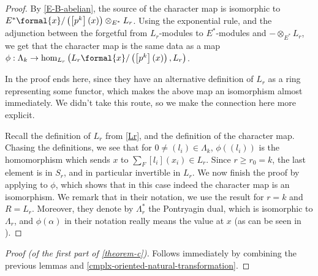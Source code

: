 \begin{proof}
	By \cref{E-B-abelian}, the source of the character map is isomorphic to $E^*\formal{x}/\left(\left[p^k\right]\left(x\right)\right) \otimes_{E^*} L_r$.
	Using the exponential rule, and the adjunction between the forgetful from $L_r$-modules to $E^*$-modules and $- \otimes_{E^*} L_r$, we get that the character map is the same data as a map
	$\phi: \Lambda_k \to \hom_{L_r}\left(L_r\formal{x}/\left(\left[p^k\right]\left(x\right)\right), L_r\right)$.
	
	In \cite{HKR} the proof ends here, since they have an alternative definition of $L_r$ as a ring representing some functor, which makes the above map an isomorphism almost immediately.
	We didn't take this route, so we make the connection here more explicit.
	
	Recall the definition of $L_r$ from \cref{Lr}, and the definition of the character map.
	Chasing the definitions, we see that for $0 \neq \left(l_i\right) \in \Lambda_k$, $\phi\left(\left(l_i\right)\right)$ is the homomorphism which sends $x$ to $\sum_F \left[l_i\right]\left(x_i\right) \in L_r$.
	Since $r \geq r_0 = k$, the last element is in $S_r$, and in particular invertible in $L_r$.
	We now finish the proof by applying \cite[6.2]{HKR} to $\phi$, which shows that in this case indeed the character map is an isomorphism.
	We remark that in their notation, we use the result for $r = k$ and $R = L_r$.
	Moreover, they denote by $\Lambda_r^*$ the Pontryagin dual, which is isomorphic to $\Lambda_r$, and $\phi\left(\alpha\right)$ in their notation really means the value at $x$ (as can be seen in \cite[5.5]{HKR}).
\end{proof}

\begin{proof}[Proof (of the first part of \cref{theorem-c})]
	Follows immediately by combining the previous lemmas and \cref{cmplx-oriented-natural-transformation}.
\end{proof}
